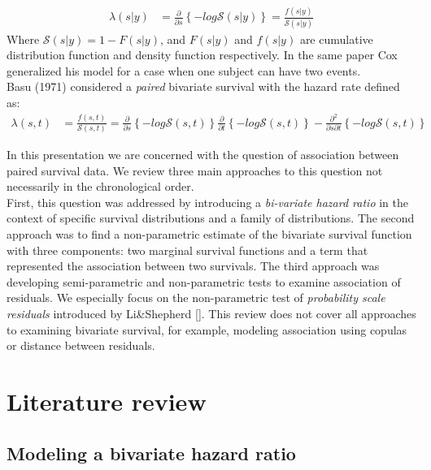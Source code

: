 \documentclass[]{article}
\begin{document}
$$
\begin{aligned}
	\lambda(s|y) &= \frac{\partial}{\partial s}\left\{  -log \mathcal{S}(s|y)  \right\} =
	             \frac{f(s|y)}{\mathcal{S}(s|y)}
\end{aligned}
$$
Where $\mathcal{S}(s|y) = 1-F(s|y)$, and $F(s|y)$ and $f(s|y)$ are cumulative distribution function and density function respectively. In the same paper %
Cox generalized his model for a case when one subject can have two events.\\
Basu (1971) %
considered a \emph{paired} bivariate survival with the hazard rate defined as:
$$
\begin{aligned}
	\lambda(s,t) &= \frac{f(s,t)}{\mathcal{S}(s,t)} = \frac{\partial}{\partial s}\left\{  -log \mathcal{S}(s,t)  \right\}\frac{\partial}{\partial t}\left\{  -log \mathcal{S}(s,t)  \right\} - \frac{\partial^2}{\partial s\partial t}\left\{  -log \mathcal{S}(s,t)  \right\}
\end{aligned}
$$

In this presentation we are concerned with the question of association between paired survival data. We review three main approaches to this question not necessarily in the chronological order.\\
First, this question was addressed by introducing a \emph{bi-variate hazard ratio} in the context of specific survival distributions and a family of distributions. The second approach was to find a non-parametric estimate of the bivariate survival function with three components: two marginal survival functions and a term that represented the association between two survivals. The third approach was developing semi-parametric and non-parametric tests to examine association of residuals. We especially focus on the non-parametric test of \emph{probability scale residuals} introduced by Li\&Shepherd [\cite{li2012new}]. This review does not cover all approaches to examining bivariate survival, for example, modeling association using copulas or distance between residuals. 

\section{Literature review}

\subsection{Modeling a bivariate hazard ratio}
\end{document}
